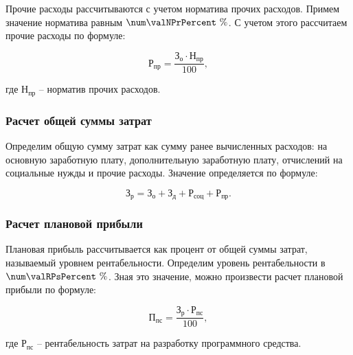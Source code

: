 
Прочие расходы рассчитываются с учетом норматива прочих расходов. Примем значение
норматива равным $ \num\valNPrPercent \ \% $. С учетом этого рассчитаем прочие расходы
по формуле:

\begin{equation}
  \label{eq:econ:RPr}
  \text{Р}_\text{пр} = \frac{\text{З}_\text{о} \cdot \text{Н}_\text{пр}}
    {100},
\end{equation}
\begin{explanationx}
  \item[где] $ \text{Н}_\text{пр} $ -- норматив прочих расходов.
\end{explanationx}


\subsubsection{Расчет общей суммы затрат}

Определим общую сумму затрат как сумму ранее вычисленных расходов: на основную
заработную плату, дополнительную заработную плату, отчислений на социальные нужды и
прочие расходы. Значение определяется по формуле:

\begin{equation}
  \label{eq:econ:Zr}
  \text{З}_\text{р} = \text{З}_\text{о} + \text{З}_\text{д}
    + \text{Р}_\text{соц} + \text{Р}_\text{пр}.
\end{equation}
\fixSectionSpace
\subsubsection{Расчет плановой прибыли}


Плановая прибыль рассчитывается как процент от общей суммы затрат, называемый
уровнем рентабельности. Определим уровень рентабельности
в $ \num\valRPsPercent \ \% $. Зная это значение, можно произвести расчет плановой
прибыли по формуле:

\begin{equation}
  \label{eq:econ:PPs}
  \text{П}_\text{пс} = \frac{\text{З}_\text{р} \cdot \text{Р}_\text{пс}}
    {100},
\end{equation}
\begin{explanationx}
  \item[где] $ \text{Р}_\text{пс} $ -- рентабельность затрат на разработку программного средства.
\end{explanationx}

